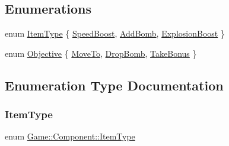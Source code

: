 \subsection*{Enumerations}
\begin{DoxyCompactItemize}
\item 
enum \mbox{\hyperlink{namespace_game_1_1_component_a95e2dc2d86d1c4789cc068f51d59ec29}{Item\+Type}} \{ \mbox{\hyperlink{namespace_game_1_1_component_a95e2dc2d86d1c4789cc068f51d59ec29a129a71d8ff5775ed8d994f4a0fc13b0d}{Speed\+Boost}}, 
\mbox{\hyperlink{namespace_game_1_1_component_a95e2dc2d86d1c4789cc068f51d59ec29a47443d62ec5d06460dd3103049c45c9e}{Add\+Bomb}}, 
\mbox{\hyperlink{namespace_game_1_1_component_a95e2dc2d86d1c4789cc068f51d59ec29a75ab3502f4595c36bf6acc1ac5531584}{Explosion\+Boost}}
 \}
\item 
enum \mbox{\hyperlink{namespace_game_1_1_component_ac1792a9e1e109dc127b77dc4a2cddba1}{Objective}} \{ \mbox{\hyperlink{namespace_game_1_1_component_ac1792a9e1e109dc127b77dc4a2cddba1af0a2c3920cfacbcce397312699562c56}{Move\+To}}, 
\mbox{\hyperlink{namespace_game_1_1_component_ac1792a9e1e109dc127b77dc4a2cddba1a9d0d7615c1c7f849e45c906552b126d7}{Drop\+Bomb}}, 
\mbox{\hyperlink{namespace_game_1_1_component_ac1792a9e1e109dc127b77dc4a2cddba1ac77030f280f7b2ca379fb5797001d6e4}{Take\+Bonus}}
 \}
\end{DoxyCompactItemize}


\subsection{Enumeration Type Documentation}
\mbox{\label{namespace_game_1_1_component_a95e2dc2d86d1c4789cc068f51d59ec29}} 
\subsubsection{\texorpdfstring{Item\+Type}{ItemType}}
{\footnotesize\ttfamily enum \mbox{\hyperlink{namespace_game_1_1_component_a95e2dc2d86d1c4789cc068f51d59ec29}{Game\+::\+Component\+::\+Item\+Type}}}

